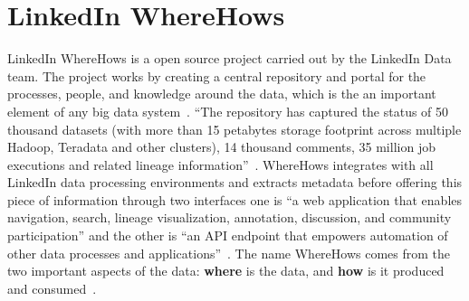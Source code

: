 \section{LinkedIn WhereHows}

LinkedIn WhereHows is a open source project carried out by the LinkedIn Data team. The project works 
by creating a central repository and portal for the processes, people, and knowledge around the data, 
which is the an important element of any big data system~\cite{hid-sp18-405-www-wherehows}. ``The 
repository has captured the status of 50 thousand datasets (with more than 15 petabytes storage 
footprint across multiple Hadoop, Teradata and other clusters), 14 thousand comments, 35 million job 
executions and related lineage information''~\cite{hid-sp18-405-www-wherehows}. WhereHows 
integrates with all LinkedIn data processing environments and extracts metadata before offering this 
piece of information through two interfaces one is ``a web application that enables navigation, search, 
lineage visualization, annotation, discussion, and community participation'' and the other is ``an API 
endpoint that empowers automation of other data processes and 
applications''~\cite{hid-sp18-405-www-wherehows}. The name WhereHows comes from the  two 
important aspects of the data: \textbf{where} is the data, and \textbf{how} is it produced and 
consumed~\cite{hid-sp18-405-githubwiki-wherehows}.